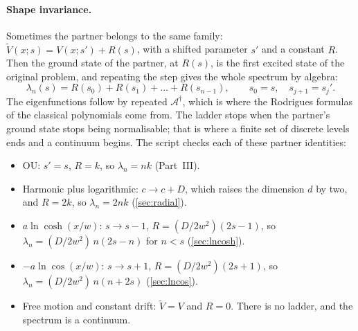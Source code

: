 \documentclass[11pt]{article}
\numberwithin{equation}{section}
\begin{document}
\paragraph{Shape invariance.} Sometimes the partner belongs to the same family: $\tilde V(x;s)=V(x;s')+R(s)$, with a
shifted parameter $s'$ and a constant $R$. Then the ground state of the partner, at $R(s)$, is the first excited
state of the original problem, and repeating the step gives the whole spectrum by algebra:
\begin{equation}
  \lambda_n(s)=R(s_0)+R(s_1)+\dots+R(s_{n-1}),\qquad s_0=s,\quad s_{j+1}=s_j' .
  \label{eq:shape}
\end{equation}
The eigenfunctions follow by repeated $\mathcal A^\dagger$, which is where the Rodrigues formulas of the classical
polynomials come from. The ladder stops when the partner's ground state stops being normalisable; that is where
a finite set of discrete levels ends and a continuum begins. The script checks each of these partner identities:
\begin{itemize}
  \item OU: $s'=s$, $R=k$, so $\lambda_n=nk$ (Part~III).
  \item Harmonic plus logarithmic: $c\to c+D$, which raises the dimension $d$ by two, and $R=2k$, so
        $\lambda_n=2nk$ (\cref{sec:radial}).
  \item $a\ln\cosh(x/w)$: $s\to s-1$, $R=(D/2w^2)(2s-1)$, so $\lambda_n=(D/2w^2)\,n(2s-n)$ for $n<s$
        (\cref{sec:lncosh}).
  \item $-a\ln\cos(x/w)$: $s\to s+1$, $R=(D/2w^2)(2s+1)$, so $\lambda_n=(D/2w^2)\,n(n+2s)$ (\cref{sec:lncos}).
  \item Free motion and constant drift: $\tilde V=V$ and $R=0$. There is no ladder, and the spectrum is a
        continuum.
\end{itemize}
\end{document}
